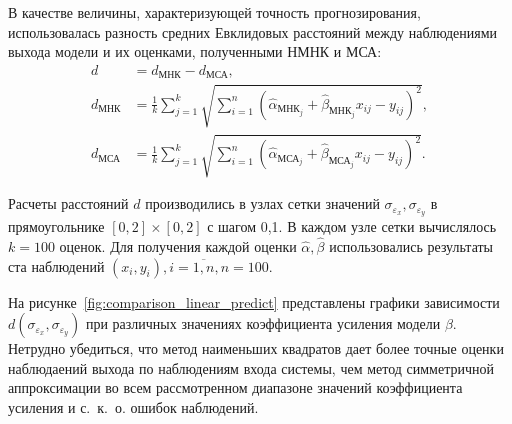 В качестве величины, характеризующей точность прогнозирования,
использовалась разность средних Евклидовых расстояний между наблюдениями выхода модели и
их оценками, полученными НМНК и МСА:
\begin{equation*}
  \begin{aligned}
    d &= d_{\text{МНК}} - d_{\text{МСА}}, \\
    d_{\text{МНК}} &= \frac{1}{k} \sum_{j=1}^k \sqrt{ \sum_{i=1}^n (\hat{\alpha}_{\text{МНК}_j} + \hat{\beta}_{\text{МНК}_j} x_{ij} - y_{ij})^2}, \\
    d_{\text{МСА}} &= \frac{1}{k} \sum_{j=1}^k \sqrt{ \sum_{i=1}^n (\hat{\alpha}_{\text{МСА}_j} + \hat{\beta}_{\text{МСА}_j} x_{ij} - y_{ij})^2}.
    \end{aligned}
\end{equation*}

Расчеты расстояний \( d \) производились в узлах сетки значений
\( \sigma_{\varepsilon_x}, \sigma_{\varepsilon_y} \) в прямоугольнике
\( [0, 2] \times [0, 2] \) с шагом 0{,}1.
В каждом узле сетки вычислялось \( k = 100 \) оценок.
Для получения каждой оценки \( \hat{\alpha}, \hat{\beta} \) использовались результаты
ста наблюдений \( ( x_i, y_i ), i = \overline{1, n}, n = 100 \).

На рисунке~\ref{fig:comparison_linear_predict} представлены графики зависимости
\( d(\sigma_{\varepsilon_x}, \sigma_{\varepsilon_y}) \) при различных значениях
коэффициента усиления модели \( \beta \).
Нетрудно убедиться, что метод наименьших квадратов дает более точные оценки наблюдаений
выхода по наблюдениям входа системы, чем метод симметричной аппроксимации
во всем рассмотренном диапазоне значений коэффициента усиления и с.~к.~о. ошибок наблюдений.

